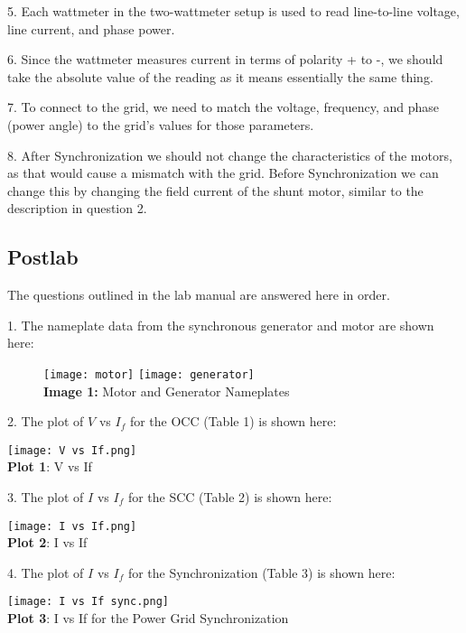 \documentclass[]{report}
\begin{document}
5. Each wattmeter in the two-wattmeter setup is used to read line-to-line voltage, line current, and phase power. 

6. Since the wattmeter measures current in terms of polarity + to -, we should take the absolute value of the reading as it means essentially the same thing.

7. To connect to the grid, we need to match the voltage, frequency, and phase (power angle) to the grid's values for those parameters.

8. After Synchronization we should not change the characteristics of the motors, as that would cause a mismatch with the grid. Before Synchronization we can change this by changing the field current of the shunt motor, similar to the description in question 2.

\subsection*{Postlab}

The questions outlined in the lab manual are answered here in order.

1. The nameplate data from the synchronous generator and motor are shown here:

\begin{figure}[H]
	\centering
	\texttt{[image: motor]}
	\texttt{[image: generator]} \\
	\textbf{Image 1:} Motor and Generator Nameplates
\end{figure}

2. The plot of $V$ vs $I_f$ for the OCC (Table 1) is shown here:

\begin{center}
	\centering
	\texttt{[image: V vs If.png]} \\
	\textbf{Plot 1}: V vs If
\end{center}

3. The plot of $I$ vs $I_f$ for the SCC (Table 2) is shown here:

\begin{center}
	\centering
	\texttt{[image: I vs If.png]} \\
	\textbf{Plot 2}: I vs If
\end{center}

4. The plot of $I$ vs $I_f$ for the Synchronization (Table 3) is shown here:

\begin{center}
	\centering
	\texttt{[image: I vs If sync.png]} \\
	\textbf{Plot 3}: I vs If for the Power Grid Synchronization
\end{center}
\end{document}
